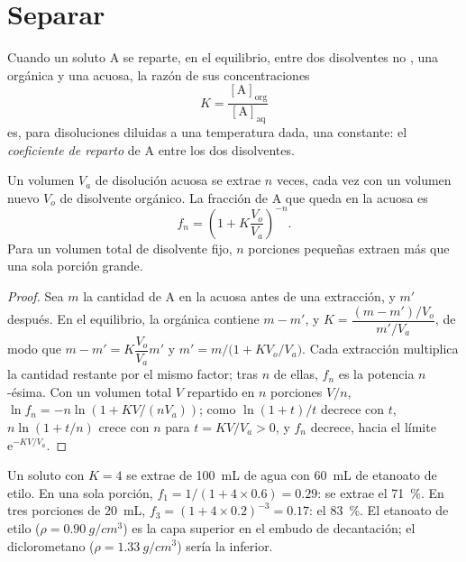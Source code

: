 \section{Separar}

\begin{definition}\label{def:b1:lab-techniques-1:partition-coefficient}
Cuando un soluto A se reparte, en el equilibrio, entre dos disolventes no
, una  orgánica y una  acuosa, la razón de sus
concentraciones
\[
  K = \frac{[\mathrm{A}]_{\mathrm{org}}}{[\mathrm{A}]_{\mathrm{aq}}}
\]
es, para disoluciones diluidas a una temperatura dada, una constante: el
\emph{coeficiente de reparto} de A entre
los dos disolventes.
\end{definition}

\begin{proposition}\label{prop:b1:lab-techniques-1:multiple-extractions}
Un volumen $V_a$ de disolución acuosa se extrae $n$ veces, cada vez con
un volumen nuevo $V_o$ de disolvente orgánico. La fracción de A que queda
en la  acuosa es
\[
  f_n = \left(1 + K \frac{V_o}{V_a}\right)^{-n}.
\]
Para un volumen total de disolvente fijo, $n$ porciones pequeñas extraen
más que una sola porción grande.
\end{proposition}
\begin{proof}
Sea $m$ la cantidad de A en la  acuosa antes de una extracción, y
$m'$ después. En el equilibrio, la  orgánica contiene $m - m'$, y
$K = \dfrac{(m - m')/V_o}{m'/V_a}$, de modo que $m - m' = K\dfrac{V_o}{V_a} m'$ y
$m' = m\big/\bigl(1 + K V_o/V_a\bigr)$. Cada extracción multiplica la
cantidad restante por el mismo factor; tras $n$ de ellas, $f_n$ es la
potencia $n$-ésima. Con un volumen total $V$ repartido en $n$ porciones
$V/n$, $\ln f_n = -n \ln(1 + KV/(nV_a))$; como $\ln(1+t)/t$ decrece con
$t$, $n \ln(1 + t/n)$ crece con $n$ para $t = KV/V_a > 0$, y $f_n$
decrece, hacia el límite $\mathrm{e}^{-KV/V_a}$.
\end{proof}

\begin{example}
Un soluto con $K = 4$ se extrae de \qty{100}{mL} de agua con
\qty{60}{mL} de etanoato de etilo. En una sola porción,
$f_1 = 1/(1 + 4 \times 0.6) = 0.29$: se extrae el \qty{71}{\percent}. En
tres porciones de \qty{20}{mL}, $f_3 = (1 + 4 \times 0.2)^{-3} = 0.17$:
el \qty{83}{\percent}. El etanoato de etilo ($\rho = \qty{0.90}{g/cm^3}$)
es la capa superior en el embudo de decantación; el diclorometano
($\rho = \qty{1.33}{g/cm^3}$) sería la inferior.
\end{example}

